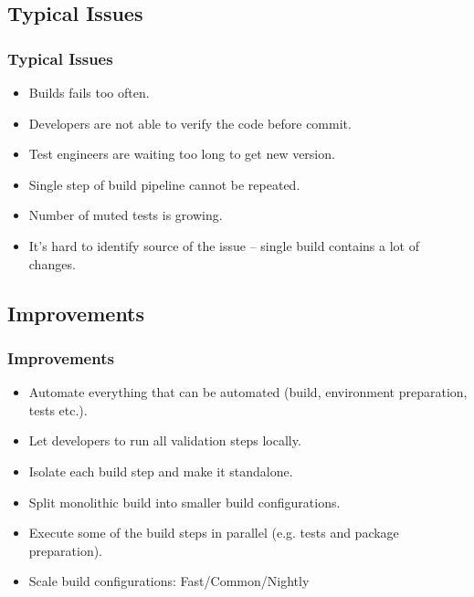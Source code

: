 \subsection[]{Typical Issues}
\begin{frame}
\frametitle{Typical Issues}
\begin{itemize}
	\item Builds fails too often.
	\item Developers are not able to verify the code before commit.
	\item Test engineers are waiting too long to get new version.
	\item Single step of build pipeline cannot be repeated.
	\item Number of muted tests is growing.
	\item It’s hard to identify source of the issue – single build contains a lot of changes.
\end{itemize}
\end{frame}

\subsection[]{Improvements}
\begin{frame}
\frametitle{Improvements}
\begin{itemize}
	\item Automate everything that can be automated (build, environment preparation, tests etc.).
	\item Let developers to run all validation steps locally.
	\item Isolate each build step and make it standalone.
	\item Split monolithic build into smaller build configurations.
	\item Execute some of the build steps in parallel (e.g. tests and package preparation).
	\item Scale build configurations: Fast/Common/Nightly
\end{itemize}
\end{frame}

